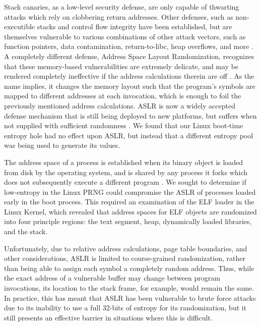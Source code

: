 Stack canaries, as a low-level security defense, are only capable of thwarting attacks which rely on clobbering return addresses.  Other defenses, such as non-executible stacks and control flow integrity have been established, but are themselves vulnerable to various combinations of other attack vectors, such as function pointers, data contamination, return-to-libc, heap overflows, and more \cite{lowLevSec, freeVuln, format, intOverflow, cfi}.  A completely different defense, Address Space Layout Randomization,  recognizes that these memory-based vulnerabilities are extremely delicate, and may be rendered completely ineffective if the address calculations therein are off \cite{PaX}.  As the name implies, it changes the memory layout such that the program's symbols are mapped to different addresses at each invocation, which is enough to foil the previously mentioned address calculations.  ASLR is now a widely accepted defense mechanism that is still being deployed to new platforms, but suffers when not supplied with sufficient randomness \cite{android_ASLR, ASLP}.  We found that our Linux boot-time entropy hole had no effect upon ASLR, but instead that a different entropy pool was being used to generate its values.

The address space of a process is established when its binary object is loaded from disk by the operating system, and is shared by any process it forks which does not subsequently execute a different program \cite{linkers_loaders}.  We sought to determine if low-entropy in the Linux PRNG could compromise the ASLR of processes loaded early in the boot process.  This required an examination of the ELF loader in the Linux Kernel, which revealed that address spaces for ELF objects are randomized into four principle regions: the text segment, heap, dynamically loaded libraries, and the stack.  

Unfortunately, due to relative address calculations, page table boundaries, and other considerations, ASLR is limited to course-grained randomization, rather than being able to assign each symbol a completely random address\cite{ASLR}.  Thus, while the exact address of a vulnerable buffer may change between program invocations, its location to the stack frame, for example, would remain the same.  In practice, this has meant that ASLR has been vulnerable to brute force attacks due to its inability to use a full 32-bits of entropy for its randomization, but it still presents an effective barrier in situations where this is difficult. 

